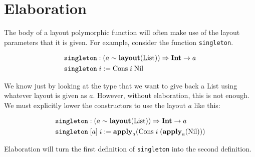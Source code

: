 \section{Elaboration}

The body of a layout polymorphic \Pika{} function will often make use of the 
layout parameters that it is given. For example, consider the function \texttt{singleton}.

\begin{align*}
  &\texttt{singleton} : (a \sim \textbf{layout}(\textrm{List})) \Rightarrow \textbf{Int} \rightarrow a\\
  &\texttt{singleton}\; i := \textrm{Cons}\; i\; \textrm{Nil}
\end{align*}

\noindent
We know just by looking at the type that we want to give back a \textrm{List} using
whatever layout is given as $a$. However, without elaboration, this is not enough. We must
explicitly lower the constructors to use the layout $a$ like this:

\begin{align*}
  &\texttt{singleton} : (a \sim \textbf{layout}(\textrm{List})) \Rightarrow \textbf{Int} \rightarrow a\\
  &\texttt{singleton}\; [a]\; i := \textbf{apply}_a(\textrm{Cons}\; i\; (\textbf{apply}_a(\textrm{Nil})))
\end{align*}

\noindent
Elaboration will turn the first definition of \texttt{singleton} into the second definition.

